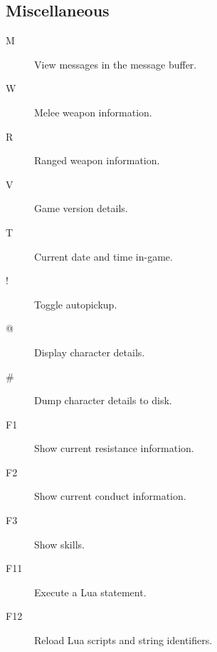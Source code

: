 \subsection{Miscellaneous}

\begin{description}
\item[M]
View messages in the message buffer.
\item[W] 
Melee weapon information.
\item[R] 
Ranged weapon information.
\item[V] 
Game version details.
\item[T] 
Current date and time in-game.
\item[!]
Toggle autopickup.
\item[@]
Display character details.
\item[\#] 
Dump character details to disk.
\item[F1] 
Show current resistance information.
\item[F2] 
Show current conduct information.
\item[F3]
Show skills.
\item[F11] 
Execute a Lua statement.
\item[F12] 
Reload Lua scripts and string identifiers.
\end{description}

